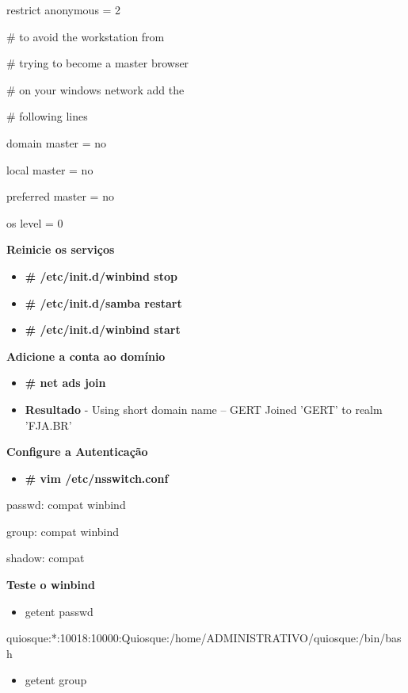         restrict anonymous = 2

\# to avoid the workstation from

\# trying to become a master browser

\# on your windows network add the

\# following lines

        domain master = no

        local master = no

        preferred master = no

        os level = 0

\textbf{Reinicie os serviços}

\begin{itemize}
	\item \textbf{\# /etc/init.d/winbind stop}
	\item \textbf{\# /etc/init.d/samba restart}
	\item \textbf{\# /etc/init.d/winbind start}
\end{itemize}

\textbf{Adicione a conta ao domínio}

\begin{itemize}
	\item \textbf{\# net ads join}
	\item \textbf{Resultado} - Using short domain name – GERT Joined 'GERT' to realm 'FJA.BR'
\end{itemize}

\textbf{Configure a Autenticação}

\begin{itemize}
	\item \textbf{\# vim /etc/nsswitch.conf}
\end{itemize}

	passwd:         compat winbind

	group:          compat winbind

	shadow:         compat

\textbf{Teste o winbind}

\begin{itemize}
	\item {getent passwd}
\end{itemize}

quiosque:*:10018:10000:Quiosque:/home/ADMINISTRATIVO/quiosque:/bin/bash

\begin{itemize}
	\item {getent group}
\end{itemize}

